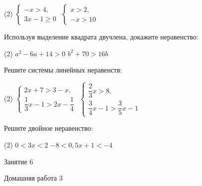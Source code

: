 \begin{class}[number=5]
\begin{listofex}[resume]
		\begin{tasks}(2)
			\task \( \left\{
			\begin{array}{l}
				-x>4,\\
				3x-1\geq0
			\end{array}
			\right. \)
		\task \( \left\{
		\begin{array}{l}
			x>2,\\
			-x>10
		\end{array}
		\right. \)
		\end{tasks}
		\item Используя выделение квадрата двучлена, докажите неравенство:
		\begin{tasks}(2)
			\task \( a^2-6a+14>0 \)
			\task \( b^2+70>16b \)
		\end{tasks}
		\item Решите системы линейных неравенств:
		\begin{tasks}(2)
			\task \( \left\{
			\begin{array}{l}
				2x+7>3-x,\\
				\dfrac{1}{3}x-1>2x-\dfrac{1}{4}
			\end{array}
			\right. \)
			\task \( \left\{
			\begin{array}{l}
				\dfrac{2}{3}x>8,\\[1em]
				\dfrac{3}{4}x-1>\dfrac{3}{5}x-1
			\end{array}
			\right. \)
		\end{tasks}
		\item Решите двойное неравенство:
		\begin{tasks}(2)
			\task \( 0<3x<2 \)
			\task \( -8<0,5x+1<-4 \)
		\end{tasks}
	\end{listofex}
\end{class}

\begin{class}[number=6]
	\begin{listofex}
		\item Занятие 6
	\end{listofex}
\end{class}

\begin{homework}[number=3]
	\begin{listofex}
		\item Домашняя работа 3
	\end{listofex}
\end{homework}

